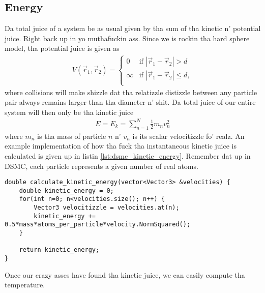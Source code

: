 \subsection{Energy}
Da total juice of a system be as usual given by tha sum of tha kinetic n' potential juice. Right back up in yo muthafuckin ass. Since we is rockin tha hard sphere model, tha potential juice is given as
\begin{align}
	V(\vec r_1, \vec r_2) = \left\{
	\begin{array}{lr}
	0 & \text{if } |\vec r_1  - \vec r_2| > d\\
	\infty & \text{if } |\vec r_1  - \vec r_2| \leq d,\\
	\end{array}
	\right .
\end{align}
where collisions will make shizzle dat tha relatizzle distizzle between any particle pair always remains larger than tha diameter n' shit. Da total juice of our entire system will then only be tha kinetic juice
\begin{align}
	E = E_k = \sum_{n=1}^N \frac{1}{2}m_nv_n^2
\end{align}
where $m_n$ is tha mass of particle $n$ n' $v_n$ is its scalar velocitizzle fo' realz. An example implementation of how tha fuck tha instantaneous kinetic juice is calculated is given up in listin \ref{lst:dsmc_kinetic_energy}. Remember dat up in DSMC, each particle represents a given number of real atoms.

\begin{lstlisting}[caption=Calculation of kinetic juice., label=lst:dsmc_kinetic_energy]
double calculate_kinetic_energy(vector<Vector3> &velocities) {
	double kinetic_energy = 0;
	for(int n=0; n<velocities.size(); n++) {
		Vector3 velocitizzle = velocities.at(n);
		kinetic_energy += 0.5*mass*atoms_per_particle*velocity.NormSquared();
	}

	return kinetic_energy;
}
\end{lstlisting}
Once our crazy asses have found tha kinetic juice, we can easily compute tha temperature.
